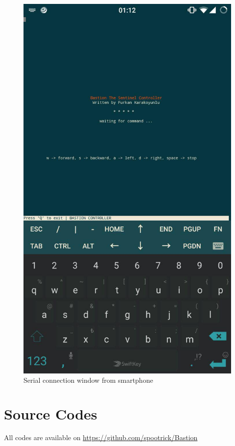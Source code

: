 \documentclass[12pt,a4paper]{article}
\begin{document}
\begin{figure}[h!]
  \begin{center}
    \includegraphics[scale=0.2]{serial_phone}
    \caption{Serial connection window from smartphone}
  \end{center}
\end{figure}




\pagebreak
\section{Source Codes}
All codes are available on \href {https://github.com/spootrick/Bastion}{https://github.com/spootrick/Bastion}\\
\end{document}
